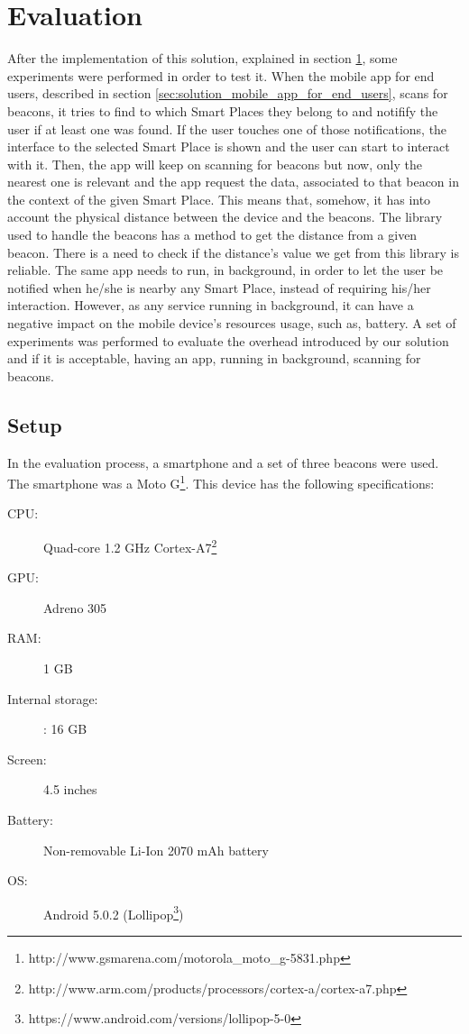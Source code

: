 
\section{Evaluation}
\label{sec:evaluation}
After the implementation of this solution, explained in section \ref{sec:evaluation}, some experiments were performed in order to test it.
When the mobile app for end users,
described in section \ref{sec:solution_mobile_app_for_end_users}, scans for beacons, it tries to find to which Smart Places they belong to and notifify the user if at least one was found.
If the user touches one of those notifications, the interface to the selected Smart Place is shown and the user can start to interact with it.
Then, the app will keep on scanning for beacons but now, only the nearest one is relevant and the app request the data, associated to that beacon in the context of the given Smart Place.
This means that, somehow, it has into account the physical distance between the device and the beacons.
The library used to handle the beacons has a method to get the distance from a given beacon.
There is a need to check if the distance's value we get from this library is reliable.
The same app needs to run, in background, in order to let the user be notified when he/she is nearby any Smart Place, instead of requiring his/her interaction.
However, as any service running in background, it can have a negative impact on the mobile device's resources usage, such as, battery.
A set of experiments was performed to evaluate the overhead introduced by our solution and if it is acceptable, having an app, running in background, scanning for beacons.

\subsection{Setup}
\label{sec:evaluation_setup}
In the evaluation process, a smartphone and a set of three beacons were used.
The smartphone was a 
Moto G\footnote{http://www.gsmarena.com/motorola\_moto\_g-5831.php}.
This device has the following specifications:
\begin{description}
  \item[\gls{CPU}:] Quad-core 1.2 GHz Cortex-A7\footnote{http://www.arm.com/products/processors/cortex-a/cortex-a7.php}
  \item[\gls{GPU}:] Adreno 305
  \item[\gls{RAM}:] 1 \gls{GB}
  \item[Internal storage:]: 16 \gls{GB}
  \item[Screen:] 4.5 inches
  \item[Battery:] Non-removable Li-Ion 2070 \gls{mAh} battery
  \item[\gls{OS}:] Android 5.0.2 (Lollipop\footnote{https://www.android.com/versions/lollipop-5-0})
\end{description}

